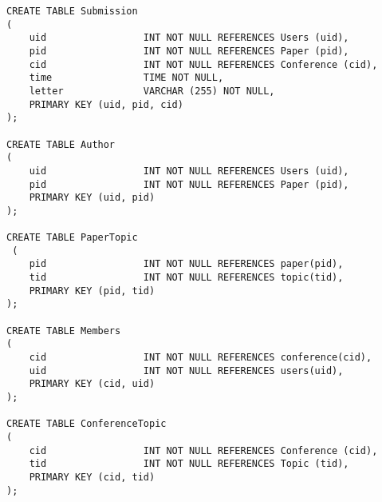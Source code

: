 \documentclass[12pt]{article}
\newcommand{\<}{\langle}
\renewcommand{\>}{\rangle}
\begin{document}
\begin{verbatim}
CREATE TABLE Submission
(
    uid                 INT NOT NULL REFERENCES Users (uid),
    pid                 INT NOT NULL REFERENCES Paper (pid),
    cid                 INT NOT NULL REFERENCES Conference (cid),
    time                TIME NOT NULL,
    letter              VARCHAR (255) NOT NULL,
    PRIMARY KEY (uid, pid, cid)
);

CREATE TABLE Author
(
    uid                 INT NOT NULL REFERENCES Users (uid),
    pid                 INT NOT NULL REFERENCES Paper (pid),
    PRIMARY KEY (uid, pid)
);

CREATE TABLE PaperTopic
 (
    pid                 INT NOT NULL REFERENCES paper(pid),
    tid                 INT NOT NULL REFERENCES topic(tid),
    PRIMARY KEY (pid, tid)
);

CREATE TABLE Members 
(
    cid                 INT NOT NULL REFERENCES conference(cid),
    uid                 INT NOT NULL REFERENCES users(uid),
    PRIMARY KEY (cid, uid)
);

CREATE TABLE ConferenceTopic
(
    cid                 INT NOT NULL REFERENCES Conference (cid),
    tid                 INT NOT NULL REFERENCES Topic (tid),    
    PRIMARY KEY (cid, tid)
);
\end{verbatim}
\end{document}
